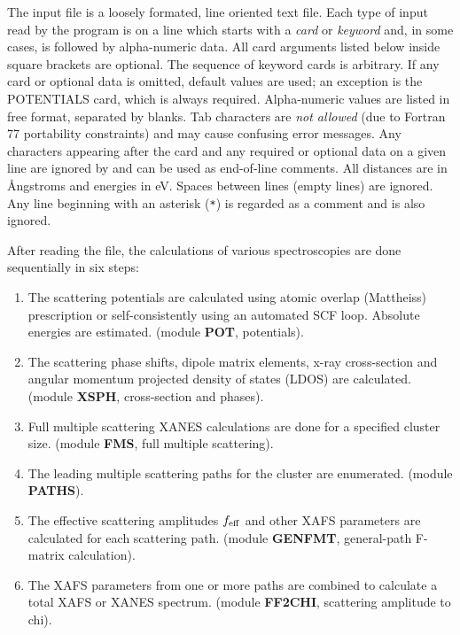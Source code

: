 \documentclass[11pt,oneside]{report} %
\begin{document}
The input file  is a loosely formated, line oriented
text file.  Each type of input read by the program is on a line which
starts with a \emph{card} or \emph{keyword} and, in
some cases, is followed by alpha-numeric data.  All card arguments
listed below inside square brackets are optional.  The sequence of
keyword cards is arbitrary.  If any card or optional data is omitted,
default values are used; an exception is the POTENTIALS card, which is
always required.  Alpha-numeric values are listed in free format,
separated by blanks.  Tab characters are \emph{not allowed} (due to
Fortran 77 portability constraints) and may cause confusing error
messages.  Any characters appearing after the card and any required or
optional data on a given line are ignored by {\feff} and can be used
as end-of-line comments.  All distances are in {\AA}ngstroms and
energies in eV.  Spaces between lines (empty lines) are ignored.  Any
line beginning with an asterisk (\texttt{*}) is regarded as a comment
and is also ignored.



After reading the  file, the calculations
of various spectroscopies are done sequentially in six steps:

\begin{enumerate}
\item  The scattering potentials are calculated using atomic
overlap (Mattheiss) prescription or self-consistently using
an automated SCF loop. Absolute energies are estimated.
(module {\bfseries POT}, potentials).
\item  The scattering  phase shifts, dipole matrix
elements, x-ray cross-section
and angular momentum projected density of states (LDOS) are calculated.
(module {\bfseries XSPH}, cross-section and phases).
\item  Full multiple scattering XANES calculations are
done for a specified cluster size.
(module {\bfseries FMS}, full multiple scattering).
\item  The leading multiple scattering paths for the cluster are enumerated.
(module {\bfseries PATHS}).
\item  The effective scattering amplitudes $f_{\rm eff}$ and other XAFS
parameters are calculated for each scattering path.
(module {\bfseries GENFMT}, general-path F-matrix calculation).
\item  The XAFS parameters from one or more paths are combined to
calculate a total XAFS or XANES spectrum.
(module {\bfseries FF2CHI}, scattering
amplitude to chi).
\end{enumerate}
\end{document}

